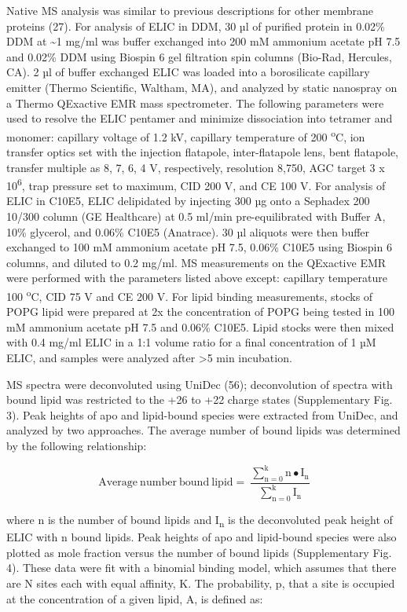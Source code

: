 Native MS analysis was similar to previous descriptions for other
membrane proteins (27). For analysis of ELIC in DDM, 30 µl of purified
protein in 0.02\% DDM at \textasciitilde{}1 mg/ml was buffer exchanged
into 200 mM ammonium acetate pH 7.5 and 0.02\% DDM using Biospin 6 gel
filtration spin columns (Bio-Rad, Hercules, CA). 2 µl of buffer
exchanged ELIC was loaded into a borosilicate capillary emitter (Thermo
Scientific, Waltham, MA), and analyzed by static nanospray on a Thermo
QExactive EMR mass spectrometer. The following parameters were used to
resolve the ELIC pentamer and minimize dissociation into tetramer and
monomer: capillary voltage of 1.2 kV, capillary temperature of 200
\textsuperscript{o}C, ion transfer optics set with the injection
flatapole, inter-flatapole lens, bent flatapole, transfer multiple as 8,
7, 6, 4 V, respectively, resolution 8,750, AGC target 3 x
10\textsuperscript{6}, trap pressure set to maximum, CID 200 V, and CE
100 V. For analysis of ELIC in C10E5, ELIC delipidated by injecting 300
µg onto a Sephadex 200 10/300 column (GE Healthcare) at 0.5 ml/min
pre-equilibrated with Buffer A, 10\% glycerol, and 0.06\% C10E5
(Anatrace). 30 µl aliquots were then buffer exchanged to 100 mM ammonium
acetate pH 7.5, 0.06\% C10E5 using Biospin 6 columns, and diluted to 0.2
mg/ml. MS measurements on the QExactive EMR were performed with the
parameters listed above except: capillary temperature 100
\textsuperscript{o}C, CID 75 V and CE 200 V. For lipid binding
measurements, stocks of POPG lipid were prepared at 2x the concentration
of POPG being tested in 100 mM ammonium acetate pH 7.5 and 0.06\% C10E5.
Lipid stocks were then mixed with 0.4 mg/ml ELIC in a 1:1 volume ratio
for a final concentration of 1 µM ELIC, and samples were analyzed after
\textgreater{}5 min incubation.

MS spectra were deconvoluted using UniDec (56); deconvolution of spectra
with bound lipid was restricted to the +26 to +22 charge states
(Supplementary Fig. 3). Peak heights of apo and lipid-bound species were
extracted from UniDec, and analyzed by two approaches. The average
number of bound lipids was determined by the following relationship:

\[\mathrm{Average\ number\ bound\ lipid = \ }\frac{\sum_{\mathrm{n = 0}}^{\mathrm{k}}{\mathrm{n \bullet}\mathrm{I}_{\mathrm{n}}}}{\sum_{\mathrm{n = 0}}^{\mathrm{k}}\mathrm{I}_{\mathrm{n}}}\]

where n is the number of bound lipids and I\textsubscript{n} is the
deconvoluted peak height of ELIC with n bound lipids. Peak heights of
apo and lipid-bound species were also plotted as mole fraction versus
the number of bound lipids (Supplementary Fig. 4). These data were fit
with a binomial binding model, which assumes that there are N sites each
with equal affinity, K. The probability, p, that a site is occupied at
the concentration of a given lipid, A, is defined as:

